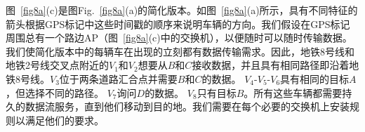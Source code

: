 
图~\ref{fig8a}(c)是图Fig.~\ref{fig8a}(a)的简化版本。如图~\ref{fig8a}(a)所示，具有不同特征的箭头根据GPS标记中这些时间戳的顺序来说明车辆的方向。我们假设在GPS标记周围总有一个路边AP（图~\ref{fig8a}(c)中的交换机），以便随时可以随时传输数据。我们使简化版本中的每辆车在出现的立刻都有数据传输需求。因此，地铁8号线和地铁2号线交叉点附近的$V_ {1}$和$V_ {2}$想要从$B$和$C$接收数据，并且具有相同路径即沿着地铁8号线。$V_ {3}$位于两条道路汇合点并需要$B$和$C$的数据。 $V_{4}$-$V_{5}$-$V_{6}$具有相同的目标$A$，但选择不同的路径。 $V_ {7}$询问$D$的数据。 $V_ {8}$只有目标$B$。所有这些车辆都需要持久的数据流服务，直到他们移动到目的地。我们需要在每个必要的交换机上安装规则以满足他们的要求。




